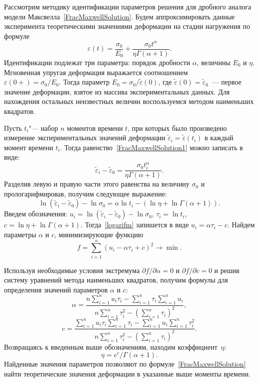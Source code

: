 Рассмотрим методику идентификации параметров решения для дробного аналога модели Максвелла~\eqref{FracMaxwellSolution}. Будем аппроксимировать данные эксперимента теоретическими значениями деформации на стадии нагружения по формуле
\begin{equation} \label{FracMaxwellSolution1}
\varepsilon(t)=\frac{\sigma_{0}}{E_{0}}+\frac{\sigma_{0}t^{\alpha}}{\eta\Gamma(\alpha+1)}.
\end{equation}
Идентификации подлежат три параметра: порядок дробности $\alpha$, величины $E_{0}$ и $\eta$. Мгновенная упругая деформация выражается соотношением\\
$\varepsilon(0+)=\sigma_{0}/E_{0}$. Тогда параметр $E_{0}=\sigma_{0}/\tilde{\varepsilon}(0)$, где $\tilde{\varepsilon}(0)=\tilde{\varepsilon}_{0}$~--- первое значение деформации, взятое из массива экспериментальных данных. Для нахождения остальных неизвестных величин воспользуемся методом наименьших квадратов.

Пусть $t_{i}$"--- набор $n$ моментов времени $t$, при которых было произведено измерение экспериментальных значений деформации  $\tilde{\varepsilon}_{i}=\tilde{\varepsilon}(t_{i})$ в каждый момент времени $t_{i}$. Тогда равенство~\eqref{FracMaxwellSolution1} можно записать в виде:
\begin{equation*}
\tilde{\varepsilon}_{i}-\tilde{\varepsilon}_{0}=\frac{\sigma_{0}t^{\alpha}_{i}}{\eta\Gamma(\alpha+1)}.
\end{equation*}
Разделив левую и правую части этого равенства на величину $\sigma_{0}$ и прологарифмировав, получим следующее выражение:
\begin{equation} \label{logarifm}
\ln(\tilde{\varepsilon}_{i}-\tilde{\varepsilon}_{0})-\ln\sigma_{0}=\alpha\ln t_{i}-(\ln\eta+\ln\Gamma(\alpha+1)).
\end{equation}
Введем обозначения: $u_{i}=\ln(\tilde{\varepsilon}_{i}-\tilde{\varepsilon}_{0})-\ln\sigma_{0}$, $\tau_{i}=\ln t_{i}$, $c=\ln \eta+\ln \Gamma(\alpha+1)$. Тогда~\eqref{logarifm} запишется в виде $u_{i}=\alpha\tau_{i}-c$. Найдем параметры $\alpha$ и $c$, минимизирующие функцию
\begin{equation} \label{function2}
f=\sum^{n}_{i=1}(u_{i}-\alpha\tau_{i}+c)^{2} \rightarrow \min.
\end{equation}

Используя необходимые условия экстремума ${\partial f}/{\partial\alpha}=0$ и ${\partial f}/{\partial c}=0$ и решив систему уравнений метода наименьших квадратов, получим формулы для определения значений параметров  $\alpha$ и $c$:
$$\alpha=\frac{n\sum^{n}_{i=1}u_{i}\tau_{i}-\sum^{n}_{i=1}\tau_{i}\sum^{n}_{i=1}u_{i}}{n\sum^{n}_{i=1}\tau_{i}^{2}-\left(\sum^{n}_{i=1}\tau_{i}\right)^{2}},
$$
$$
c=\frac{\sum^{n}_{i=1}u_{i}\tau_{i}\sum^{n}_{i=1}\tau_{i}-\sum^{n}_{i=1}u_{i}\sum^{n}_{i=1}\tau_{i}^{2}}{n\sum^{n}_{i=1}\tau_{i}^{2}-\left(\sum^{n}_{i=1}\tau_{i}\right)^{2}}.
$$
Возвращаясь к введенным выше обозначениям, находим коэффициент~$\eta$:
$$
\eta={e^{c}}/{\Gamma(\alpha+1)}.
$$
Найденные значения параметров позволяют по формуле~\eqref{FracMaxwellSolution} найти теоретические значения деформации в указанные выше моменты времени.

